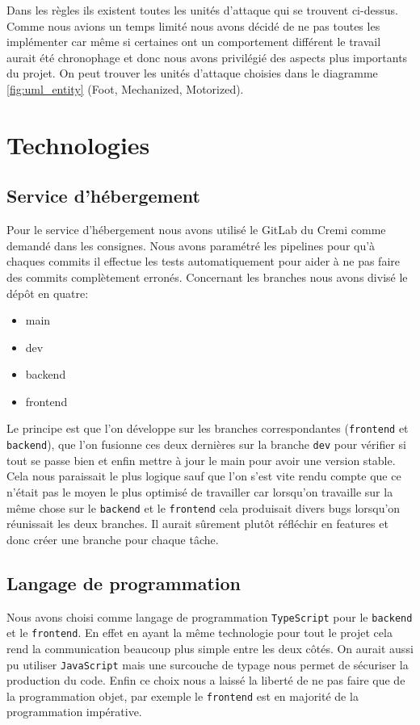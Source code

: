 Dans les règles ils existent toutes les unités d'attaque qui se trouvent ci-dessus. Comme nous avions un temps limité nous avons décidé de ne pas toutes les implémenter car même si certaines ont un comportement différent le travail aurait été chronophage et donc nous avons privilégié des aspects plus importants du projet. On peut trouver les unités d'attaque choisies dans le diagramme \ref{fig:uml_entity} (Foot, Mechanized, Motorized).

\section{Technologies}

\subsection{Service d'hébergement}

Pour le service d'hébergement nous avons utilisé le GitLab du Cremi comme demandé dans les consignes. Nous avons paramétré les pipelines pour qu'à chaques commits il effectue les tests automatiquement pour aider à ne pas faire des commits complètement erronés. Concernant les branches nous avons divisé le dépôt en quatre:
\begin{itemize}
    \item main
    \item dev
    \item backend
    \item frontend
\end{itemize}

Le principe est que l'on développe sur les branches correspondantes (\lstinline{frontend} et \lstinline{backend}), que l'on fusionne ces deux dernières sur la branche \lstinline{dev} pour vérifier si tout se passe bien et enfin mettre à jour le main pour avoir une version stable. Cela nous paraissait le plus logique sauf que l'on s'est vite rendu compte que ce n'était pas le moyen le plus optimisé de travailler car lorsqu'on travaille sur la même chose sur le \lstinline{backend} et le \lstinline{frontend} cela produisait divers bugs lorsqu'on réunissait les deux branches. Il aurait sûrement plutôt réfléchir en features et donc créer une branche pour chaque tâche.

\subsection{Langage de programmation}

Nous avons choisi comme langage de programmation \lstinline{TypeScript} pour le \lstinline{backend} et le \lstinline{frontend}. En effet en ayant la même technologie pour tout le projet cela rend la communication beaucoup plus simple entre les deux côtés. On aurait aussi pu utiliser \lstinline{JavaScript} mais une surcouche de typage nous permet de sécuriser la production du code. Enfin ce choix nous a laissé la liberté de ne pas faire que de la programmation objet, par exemple le \lstinline{frontend} est en majorité de la programmation impérative.

